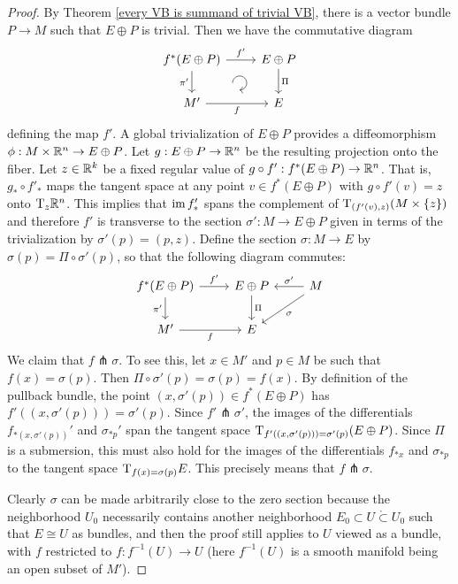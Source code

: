 \begin{proof}
By Theorem \ref{every VB is summand of trivial VB}, there is a vector bundle $P{\to} M$ such that $E\oplus P$ is trivial. Then we have the commutative diagram
    \[\begin{tikzcd}[every matrix/.append style={name=m}, execute at end picture={\draw [<-] ([xshift=-11mm,yshift=1mm]m-2-2.north) arc[start angle=-90,delta angle=270,radius=0.2cm];}]
    f^\ast(E\oplus P) \arrow[r,"f'"]\arrow[d,swap,"\pi'"]& E\oplus P\arrow[d,"\Pi"] \\
    M'\arrow[r,swap,"f"]& E
    \end{tikzcd}\]
defining the map $f'$. A global trivialization of $E\oplus P$ provides a diffeomorphism $\phi:M\times\mathbb{R}^n\to E\oplus P$. Let $g:E\oplus P\to\mathbb{R}^n$ be the resulting projection onto the fiber. Let $z\in\mathbb{R}^k$ be a fixed regular value of $g\circ f':f^\ast(E\oplus P)\to\mathbb{R}^n$. That is, $g_\ast \circ f'_\ast$ maps the tangent space at any point $v\in f^\ast(E\oplus P)$ with $g\circ f'(v)=z$ onto $\mathrm{T}_z\mathbb{R}^n$. This implies that $\operatorname{im} f_\ast '$ spans the complement of $\mathrm{T}_{(f'(v),z)}(M\times\{z\})$ and therefore $f'$ is transverse to the section $\sigma':M\to E\oplus P$ given in terms of the trivialization by $\sigma'(p)=(p,z)$. Define the section $\sigma:M\to E$ by $\sigma(p)=\Pi\circ \sigma'(p)$, so that the following diagram commutes:
  \[\begin{tikzcd}
    f^\ast(E\oplus P) \arrow[r,"f'"]\arrow[d,swap,"\pi'"]& E\oplus P\arrow[d,"\Pi"]& M\arrow[l,swap,"\sigma'"] \arrow[dl,"\sigma"]\\
    M'\arrow[r,swap,"f"]& E &
    \end{tikzcd}\]
We claim that $f\pitchfork \sigma$. To see this, let $x\in M'$ and $p\in M$ be such that $f(x)=\sigma(p)$. Then $\Pi\circ\sigma'(p)=\sigma(p)=f(x)$. By definition of the pullback bundle, the point $(x,\sigma'(p))\in f^\ast(E\oplus P)$ has $f'((x,\sigma'(p)))=\sigma'(p)$. Since $f'\pitchfork \sigma'$, the images of the differentials $f_{\ast(x,\sigma'(p))} '$ and $\sigma_{\ast p}'$ span the tangent space $\mathrm{T}_{f'((x,\sigma'(p)))=\sigma'(p)}(E\oplus P)$. Since $\Pi$ is a submersion, this must also hold for the images of the differentials $f_{\ast x}$ and $\sigma_{\ast p}$ to the tangent space $\mathrm{T}_{f(x)=\sigma(p)}E$. This precisely means that $f\pitchfork\sigma$.

Clearly $\sigma$ can be made arbitrarily close to the zero section because the neighborhood $U_0$ necessarily contains another neighborhood $E_0\subset U\mathring{\subset} U_0$ such that $E\cong U$ as bundles, and then the proof still applies to $U$ viewed as a bundle, with $f$ restricted to $f:f^{-1}(U)\to U$ (here $f^{-1}(U)$ is a smooth manifold being an open subset of $M'$).
\end{proof}

